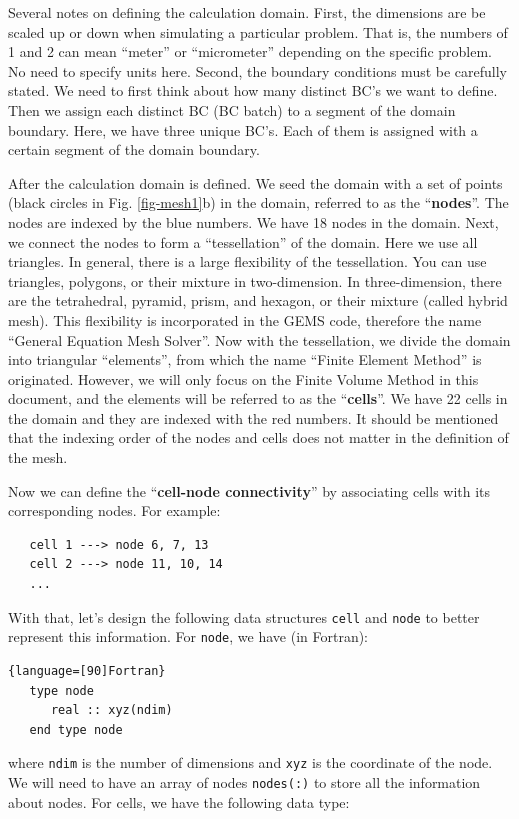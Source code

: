 \documentclass[12pt, letterpaper]{report}
\begin{document}
Several notes on defining the calculation domain. First, the dimensions are be scaled up or down
when simulating a particular problem. That is, the numbers of 1 and 2 can mean ``meter'' or
``micrometer'' depending on the specific problem. No need to specify units here. Second, the
boundary conditions must be carefully stated. We need to first think about how many distinct BC's we
want to define. Then we assign each distinct BC (BC batch) to a segment of the domain boundary. Here,
we have three unique BC's. Each of them is assigned with a certain segment of the domain boundary.
\paraspace

After the calculation domain is defined. We seed the domain with a set of points (black circles in
Fig. \ref{fig-mesh1}b) in the domain, referred to as the ``{\bf nodes}''. The nodes are indexed by
the blue numbers. We have 18 nodes in the domain. Next, we connect the nodes to form a
``tessellation'' of the domain. Here we use all triangles. In general, there is a large flexibility
of the tessellation. You can use triangles, polygons, or their mixture in two-dimension. In
three-dimension, there are the tetrahedral, pyramid, prism, and hexagon, or their mixture (called
hybrid mesh). This flexibility is incorporated in the GEMS code, therefore the name ``General
Equation Mesh Solver''.  Now with the tessellation, we divide the domain into triangular
``elements'', from which the name ``Finite Element Method'' is originated. However, we will only
focus on the Finite Volume Method in this document, and the elements will be referred to as the
``{\bf cells}''. We have 22 cells in the domain and they are indexed with the red numbers. It should
be mentioned that the indexing order of the nodes and cells does not matter in the definition of the mesh.
\paraspace

Now we can define the ``{\bf cell-node connectivity}'' by associating cells with its corresponding
nodes. For example:
\begin{verbatim}
   cell 1 ---> node 6, 7, 13
   cell 2 ---> node 11, 10, 14
   ...
\end{verbatim}
With that, let's design the following data structures \verb+cell+ and \verb+node+ to better
represent this information. For \verb+node+, we have (in Fortran):

\begin{lstlisting}{language=[90]Fortran}
   type node
      real :: xyz(ndim)
   end type node
\end{lstlisting}

where \verb+ndim+ is the number of dimensions and \verb+xyz+ is the coordinate of the node. We will
need to have an array of nodes \verb+nodes(:)+ to store all the information about nodes. For cells,
we have the following data type:
\end{document}
